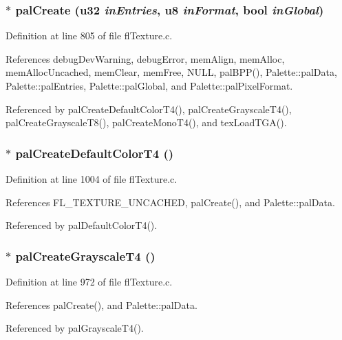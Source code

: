 \subsubsection{$\ast$ pal\-Create (u32 {\em in\-Entries}, u8 {\em in\-Format}, {\bf bool} {\em in\-Global})}\label{flTexture_8c_e3ed244173473fbbe4f84cc8e773ca88}




Definition at line 805 of file fl\-Texture.c.

References debug\-Dev\-Warning, debug\-Error, mem\-Align, mem\-Alloc, mem\-Alloc\-Uncached, mem\-Clear, mem\-Free, NULL, pal\-BPP(), Palette::pal\-Data, Palette::pal\-Entries, Palette::pal\-Global, and Palette::pal\-Pixel\-Format.

Referenced by pal\-Create\-Default\-Color\-T4(), pal\-Create\-Grayscale\-T4(), pal\-Create\-Grayscale\-T8(), pal\-Create\-Mono\-T4(), and tex\-Load\-TGA().
\subsubsection{$\ast$ pal\-Create\-Default\-Color\-T4 ()}\label{flTexture_8c_785a70ea2c158455b1f2217bfaac80c0}




Definition at line 1004 of file fl\-Texture.c.

References FL\_\-TEXTURE\_\-UNCACHED, pal\-Create(), and Palette::pal\-Data.

Referenced by pal\-Default\-Color\-T4().
\subsubsection{$\ast$ pal\-Create\-Grayscale\-T4 ()}\label{flTexture_8c_d5fed51ee2e1e83baaaa623b92819c2f}




Definition at line 972 of file fl\-Texture.c.

References pal\-Create(), and Palette::pal\-Data.

Referenced by pal\-Grayscale\-T4().
